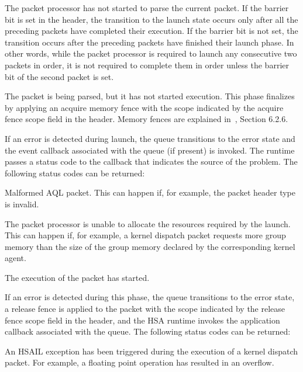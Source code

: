 \documentclass[final,oneside]{book}
\begin{document}
\begin{description}[itemsep=2pt,leftmargin=0cm, labelindent=0cm] \item[In queue]
  The packet processor has not started to parse the current packet. If the
  barrier bit is set in the header, the transition to the launch state occurs
  only after all the preceding packets have completed their execution. If the
  barrier bit is not set, the transition occurs after the preceding packets have
  finished their launch phase.  In other words, while the packet processor is
  required to launch any consecutive two packets in order, it is not required to
  complete them in order unless the barrier bit of the second packet is set.

\item[Launch] The packet is being parsed, but it has not started execution. This
  phase finalizes by applying an acquire memory fence with the scope indicated
  by the acquire fence scope field in the header. Memory fences are explained
  in~\cite{prm}, Section 6.2.6.

  If an error is detected during launch, the queue transitions to the error
  state and the event callback associated with the queue (if present) is
  invoked. The runtime passes a status code to the callback that indicates the
  source of the problem.  The following status codes can be returned:
  \begin{description}[itemsep=1.5pt,labelindent=.5cm]
  \item[\hsaref{HSA_STATUS_ERROR_INVALID_PACKET_FORMAT}] Malformed AQL
    packet. This can happen if, for example, the packet header type is invalid.
  \item[\hsaref{HSA_STATUS_ERROR_OUT_OF_RESOURCES}] The packet processor is
    unable to allocate the resources required by the launch. This can happen
    if, for example, a kernel dispatch packet requests more group memory than
    the size of the group memory declared by the corresponding kernel agent.
  \end{description}
\item[Active] The execution of the packet has started.

  If an error is detected during this phase, the queue transitions to the error
  state, a release fence is applied to the packet with the scope indicated by
  the release fence scope field in the header, and the HSA runtime invokes the
  application callback associated with the queue. The following status codes can
  be returned:
  \begin{description}[itemsep=1.5pt,labelindent=.5cm]
  \item[\hsaref{HSA_STATUS_ERROR_EXCEPTION}] An HSAIL exception has been
    triggered during the execution of a kernel dispatch packet. For example, a
    floating point operation has resulted in an overflow.
  \end{description}


\end{description}
\end{document}
